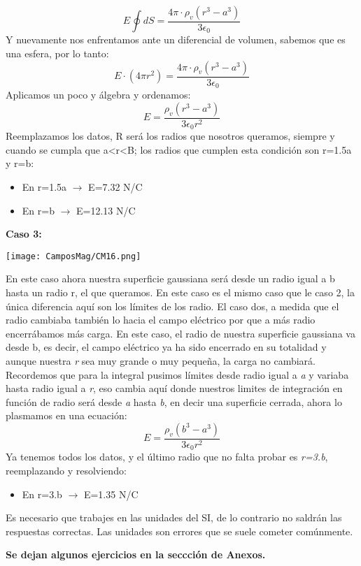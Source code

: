 \documentclass[
	12pt, %
	fleqn, %
	a4paper, %
]{LegrandOrangeBook}
\begin{document}
\begin{example}
\begin{displaymath}
E\oint dS = \frac{4\pi\cdot\rho_v\left(r^3-a^3\right)}{3\epsilon_0}
\end{displaymath}
Y nuevamente nos enfrentamos ante un diferencial de volumen, sabemos que es una esfera, por lo tanto:
\begin{displaymath}
E\cdot(4\pi r^2) = \frac{4\pi\cdot\rho_v\left(r^3-a^3\right)}{3\epsilon_0}
\end{displaymath}
Aplicamos un poco y álgebra y ordenamos:
\begin{displaymath}
E=\frac{\rho_v\left(r^3-a^3\right)}{3\epsilon_0 r^2}
\end{displaymath}
Reemplazamos los datos, R será los radios que nosotros queramos, siempre y cuando se cumpla que a<r<B; los radios que cumplen esta condición son r=1.5a y r=b:
\begin{itemize}
\item En r=1.5a $\rightarrow$ E=7.32 N/C
\item En r=b $\rightarrow$ E=12.13 N/C\\
\end{itemize}
\textbf{Caso 3:}
\begin{center}
\texttt{[image: CamposMag/CM16.png]}
\end{center}
En este caso ahora nuestra superficie gaussiana será desde un radio igual a b hasta un radio r, el que queramos. En este caso es el mismo caso que le caso 2, la única diferencia aquí son los límites de los radio. El caso dos, a medida que el radio cambiaba también lo hacia el campo eléctrico por que a más radio encerrábamos más carga. En este caso, el radio de nuestra superficie gaussiana va desde b, es decir, el campo eléctrico ya ha sido encerrado en su totalidad y aunque nuestra \textit{r} sea muy grande o muy pequeña, la carga no cambiará. Recordemos que para la integral pusimos límites desde radio igual a \textit{a} y variaba hasta radio igual a  \textit{r}, eso cambia aquí donde nuestros limites de integración en función de radio será desde \textit{a} hasta \textit{b}, en decir una superficie cerrada, ahora lo plasmamos en una ecuación:
\begin{displaymath}
E=\frac{\rho_v\left(b^3-a^3\right)}{3\epsilon_0 r^2}
\end{displaymath}
Ya tenemos todos los datos, y el último radio que no falta probar es \textit{r=3.b}, reemplazando y resolviendo:
\begin{itemize}
\item En r=3.b $\rightarrow$ E=1.35 N/C
\end{itemize}

\end{example}
\begin{remark}
Es necesario que trabajes en las unidades del SI, de lo contrario no saldrán las respuestas correctas. Las unidades son errores que se suele cometer comúnmente.
\end{remark}
\textbf{Se dejan algunos ejercicios en la seccción de Anexos.}\\
\end{document}
